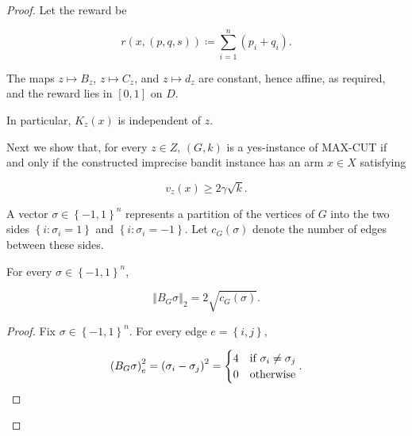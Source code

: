 {\begin{proof}
Let the reward be


\begin{equation*}
r \left( x , \left( p , q , s \right) \right) \coloneqq \sum_{i = 1}^{n} \left( p_{i} + q_{i} \right) .
\end{equation*}


The maps $z \mapsto B_{z}$, $z \mapsto C_{z}$, and $z \mapsto d_{z}$ are constant,
hence affine, as required, and the reward lies in $\left[ 0 , 1 \right]$ on $D$.

In particular, $K_{z} \left( x \right)$ is independent of $z$.

Next we show that, for every $z \in Z$, $\left( G , k \right)$ is a yes-instance of MAX-CUT
if and only if the constructed imprecise bandit instance has an arm $x \in X$
satisfying



\begin{equation*}
v_{z} \left( x \right) \ge 2 \gamma \sqrt{k} .
\end{equation*}


A vector $\sigma \in {\left\{ - 1 , 1 \right\}}^{n}$ represents a partition of the vertices of $G$
into the two sides $\left\{ i : \sigma_{i} = 1 \right\}$ and $\left\{ i : \sigma_{i} = - 1 \right\}$. Let
$c_{G} \left( \sigma \right)$ denote the number of edges between these sides.


\begin{lemma}\label{lem:simplex-cut-norm}

  For every $\sigma \in {\left\{ - 1 , 1 \right\}}^{n}$,


\begin{equation*}
{\left\Vert B_{G} \sigma \right\Vert}_{2} = 2 \sqrt{c_{G} \left( \sigma \right)} .
\end{equation*}


\end{lemma}


\begin{proof}
Fix $\sigma \in {\left\{ - 1 , 1 \right\}}^{n}$. For every edge $e = \left\{ i , j \right\}$,


\begin{equation*}
{\left( B_{G} \sigma \right)}_{e}^{2} = {\left( \sigma_{i} - \sigma_{j} \right)}^{2} = \begin{cases}
4 & \text{\normalfont if } \sigma_{i} \ne \sigma_{j} \\
0 & \text{\normalfont otherwise}
\end{cases} .
\end{equation*}



\end{proof}
\end{proof}}
